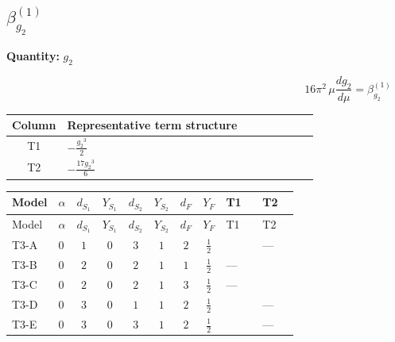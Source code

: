 \documentclass[8pt]{article}
\begin{document}
\begin{landscape}
\section*{$\beta_{g_2}^{(1)}$}
\noindent\textbf{Quantity: }$g_2$\par\smallskip
\[16\pi^2\,\mu\frac{d g_2}{d\mu}=\beta_{g_2}^{(1)}\]
\begin{center}
\begin{tabular}{@{}c >{\raggedright\arraybackslash}p{0.82\linewidth}@{}}
\toprule
Column & Representative term structure \\
\midrule
T1 & \(\displaystyle -\frac{{g_2}^3}{2}\) \\
\midrule
T2 & \(\displaystyle -\frac{17 {g_2}^3}{6}\) \\
\midrule
\bottomrule
\end{tabular}
\end{center}
\smallskip
\tiny
\begin{longtable}{@{}llcccccc >{\raggedright\arraybackslash}p{0.21\linewidth} >{\raggedright\arraybackslash}p{0.21\linewidth}@{}}
\toprule
Model & $\alpha$ & $d_{S_1}$ & $Y_{S_1}$ & $d_{S_2}$ & $Y_{S_2}$ & $d_F$ & $Y_F$ & T1 & T2 \\
\midrule
\endfirsthead
\toprule
Model & $\alpha$ & $d_{S_1}$ & $Y_{S_1}$ & $d_{S_2}$ & $Y_{S_2}$ & $d_F$ & $Y_F$ & T1 & T2 \\
\midrule
\endhead
T3-A & $0$ & $1$ & $0$ & $3$ & $1$ & $2$ & $\frac{1}{2}$ & \scriptsize\adjustbox{max width=\linewidth}{$\begin{gathered} -\frac{{g_2}^3}{2}\end{gathered}$} & --- \\
\midrule
T3-B & $0$ & $2$ & $0$ & $2$ & $1$ & $1$ & $\frac{1}{2}$ & --- & \scriptsize\adjustbox{max width=\linewidth}{$\begin{gathered} -\frac{17 {g_2}^3}{6}\end{gathered}$} \\
\midrule
T3-C & $0$ & $2$ & $0$ & $2$ & $1$ & $3$ & $\frac{1}{2}$ & --- & \scriptsize\adjustbox{max width=\linewidth}{$\begin{gathered} \frac{31 {g_2}^3}{6}\end{gathered}$} \\
\midrule
T3-D & $0$ & $3$ & $0$ & $1$ & $1$ & $2$ & $\frac{1}{2}$ & \scriptsize\adjustbox{max width=\linewidth}{$\begin{gathered} -\frac{{g_2}^3}{2}\end{gathered}$} & --- \\
\midrule
T3-E & $0$ & $3$ & $0$ & $3$ & $1$ & $2$ & $\frac{1}{2}$ & \scriptsize\adjustbox{max width=\linewidth}{$\begin{gathered} \frac{{g_2}^3}{6}\end{gathered}$} & --- \\
\midrule
\bottomrule
\end{longtable}
\clearpage

\end{landscape}
\end{document}
